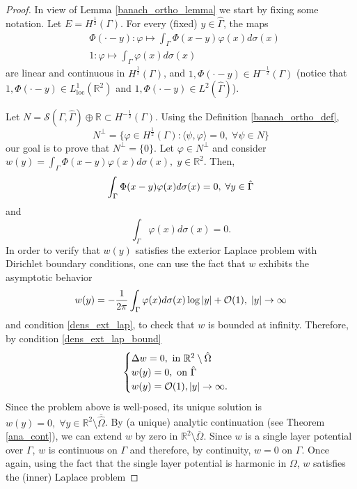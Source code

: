 \begin{proof}
    In view of Lemma \ref{banach_ortho_lemma} we start by fixing some notation. Let \(E = H^\frac{1}{2}(\Gamma)\). For every (fixed) \(y \in \hat{\Gamma}\), the maps
    \begin{align*}
        &\Phi(\cdot-y): \varphi \mapsto \int_\Gamma \Phi(x-y)\varphi(x) d\sigma(x)\\
        &1: \varphi \mapsto \int_\Gamma \varphi (x) d\sigma(x)
    \end{align*}
    are linear and continuous in \(H^\frac{1}{2}(\Gamma)\), and \(1, \Phi(\cdot-y) \in H^{-\frac{1}{2}}(\Gamma)\) (notice that \(1, \Phi(\cdot-y) \in L^1_{\text{loc}}(\mathbb{R}^2)\) and \(1, \Phi(\cdot-y) \in L^2(\hat{\Gamma})\)).
    
    Let \(N = \mathcal{S}(\Gamma, \hat{\Gamma}) \oplus \mathbb{R} \subset H^{-\frac{1}{2}}(\Gamma)\). Using the Definition \eqref{banach_ortho_def},
    \[
        N^\perp = \{\varphi \in H^{\frac{1}{2}}(\Gamma): \langle \psi, \varphi \rangle = 0, \; \forall \psi \in N\}
    \]
    our goal is to prove that \(N^\perp = \{0\}\). Let \(\varphi \in N^\perp\) and consider \(w(y) = \int_\Gamma\Phi(x-y)\varphi(x) d\sigma(x), \; y \in \mathbb{R}^2\). Then, 
    \begin{equation}\label{dens_ext_lap_bound}
        \int_\Gamma\Phi(x-y)\varphi(x) d\sigma(x) = 0, \; \forall y \in \hat{\Gamma}\\
    \end{equation}
    and
    \begin{equation}\label{dens_ext_lap}
        \int_\Gamma \varphi (x) d\sigma(x) = 0.
    \end{equation}
    In order to verify that \(w(y)\) satisfies the exterior Laplace problem with Dirichlet boundary conditions, one can use the fact that \(w\) exhibits the asymptotic behavior
    \[
        w(y) = -\frac{1}{2 \pi} \int_\Gamma \varphi (x) d\sigma(x) \log \abs{y} + \mathcal{O}(1), \; \abs{y} \rightarrow \infty
    \]
    and condition \eqref{dens_ext_lap}, to check that \(w\) is bounded at infinity. Therefore, by condition \eqref{dens_ext_lap_bound}
    \[
        \begin{cases}
            \Delta w = 0, \text{ in } \mathbb{R}^2\setminus \hat{\Omega}\\
            w(y) = 0, \text{ on } \hat{\Gamma}\\
            w(y) = \mathcal{O}(1), \abs{y} \rightarrow \infty.
        \end{cases}
    \]
    Since the problem above is well-posed, its unique solution is \(w(y) = 0, \; \forall y \in \mathbb{R}^2\setminus\overline{\hat{\Omega}}\). By (a unique) analytic continuation (see Theorem \ref{ana_cont}), we can extend \(w\) by zero in \(\mathbb{R}^2\setminus\overline{\Omega}\). Since \(w\) is a single layer potential over \(\Gamma\), \(w\) is continuous on \(\Gamma\) and therefore, by continuity, \(w = 0\) on \(\Gamma\). Once again, using the fact that the single layer potential is harmonic in \(\Omega\), \(w\) satisfies the (inner) Laplace problem

\end{proof}
